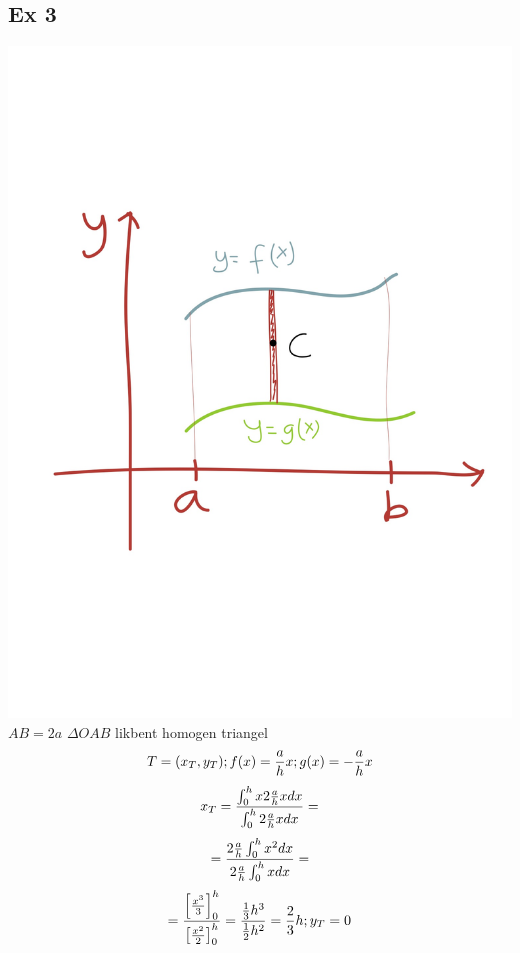 \documentclass{article}
\begin{document}
\subsection{Ex 3}
\includegraphics[scale=0.15]{img/img9.jpg}\\
$AB= 2a$ $\Delta OAB$ likbent homogen triangel
$$ T=(x_T, y_T); f(x)= \frac{a}{h}x; g(x) = -\frac{a}{h} x $$
$$ x_T = \frac{\int^h_0{x2\frac{a}{h} x dx}}{\int^h_0 2 \frac{a}{h} x dx} = $$
$$ =\frac{2\frac{a}{h} \int^h_0{x^2 dx}}{2\frac{a}{h} \int^h_0 xdx} =$$
$$ =\frac{\left[\frac{x^3}{3}\right]^h_0}{\left[\frac{x^2}{2}\right]^h_0} = \frac{\frac{1}{3} h^3}{\frac{1}{2} h^2} = \frac{2}{3} h; y_T = 0$$
\end{document}
